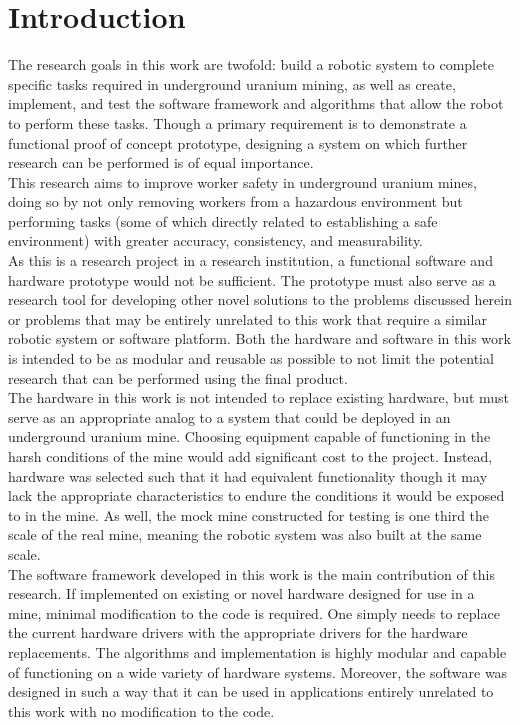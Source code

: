 \chapter{Introduction}
\label{chap:introduction}

The research goals in this work are twofold: build a robotic system to complete specific tasks required in underground uranium mining, as well as create, implement, and test the software framework and algorithms that allow the robot to perform these tasks. Though a primary requirement is to demonstrate a functional proof of concept prototype, designing a system on which further research can be performed is of equal importance.\\

This research aims to improve worker safety in underground uranium mines, doing so by not only removing workers from a hazardous environment but performing tasks (some of which directly related to establishing a safe environment) with greater accuracy, consistency, and measurability.\\

As this is a research project in a research institution, a functional software and hardware prototype would not be sufficient. The prototype must also serve as a research tool for developing other novel solutions to the problems discussed herein or problems that may be entirely unrelated to this work that require a similar robotic system or software platform. Both the hardware and software in this work is intended to be as modular and reusable as possible to not limit the potential research that can be performed using the final product.\\

The hardware in this work is not intended to replace existing hardware, but must serve as an appropriate analog to a system that could be deployed in an underground uranium mine. Choosing equipment capable of functioning in the harsh conditions of the mine would add significant cost to the project. Instead, hardware was selected such that it had equivalent functionality though it may lack the appropriate characteristics to endure the conditions it would be exposed to in the mine. As well, the mock mine constructed for testing is one third the scale of the real mine, meaning the robotic system was also built at the same scale.\\

The software framework developed in this work is the main contribution of this research. If implemented on existing or novel hardware designed for use in a mine, minimal modification to the code is required. One simply needs to replace the current hardware drivers with the appropriate drivers for the hardware replacements. The algorithms and implementation is highly modular and capable of functioning on a wide variety of hardware systems. Moreover, the software was designed in such a way that it can be used in applications entirely unrelated to this work with no modification to the code.\\

